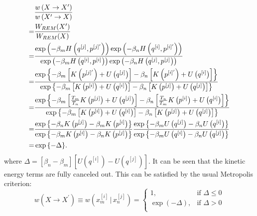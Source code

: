 \begin{align}
	&\frac{w\left(X\rightarrow X^\prime\right)}{w\left(X^\prime\rightarrow X\right)}\notag\\
	=&\frac{W_{REM}(X^\prime)}{W_{REM}(X)}\notag\\
	   =&\frac{\exp{\left(-\beta_m H\left(q^{[j]},p^{[j]^\prime}\right)\right)}\exp{\left(-\beta_n H\left(q^{[i]},p^{[i]^\prime}\right)\right)}}{\exp{\left(-\beta_m H\left(q^{[i]},p^{[i]^{ }}\right)\right)}\exp{\left(-\beta_n H\left(q^{[j]},p^{[j]^{ }}\right)\right)}}\notag\\
	   =&\frac{\exp{\left\{-\beta_m\left[K\left(p^{[j]^\prime}\right)+U\left(q^{[j]}\right)\right]-\beta_n\left[K\left(p^{[i]^\prime}\right)+U\left(q^{[i]}\right)\right]\notag\right\}}}
	   {\exp{\left\{-\beta_m\left[K\left(p^{[i]}\right)+U\left(q^{[i]}\right)\right]-\beta_n\left[K\left(p^{[j]}\right)+U\left(q^{[j]}\right)\right]\notag\right\}}}\notag\\
	   =&\frac{\exp{\left\{-\beta_m\left[\frac{T_m}{T_n}K\left(p^{[j]}\right)+U\left(q^{[j]}\right)\right]-\beta_n\left[\frac{T_n}{T_m}K\left(p^{[i]}\right)+U\left(q^{[i]}\right)\right]\notag\right\}}}
	   {\exp{\left\{-\beta_m\left[K\left(p^{[i]}\right)+U\left(q^{[i]}\right)\right]-\beta_n\left[K\left(p^{[j]}\right)+U\left(q^{[j]}\right)\right]\notag\right\}}}\notag\\
	   =&\dfrac{\exp{\left\{-\beta_n K\left(p^{[j]}\right)-\beta_m K\left(p^{[i]}\right)\right\}}}{\exp{\left\{-\beta_m K\left(p^{[i]}\right)-\beta_n K\left(p^{[j]}\right)\right\}}} \dfrac{\exp{\left\{-\beta_m U\left(q^{[j]}\right)-\beta_n U\left(q^{[i]}\right)\right\}}}{\exp{\left\{-\beta_m U\left(q^{[i]}\right)-\beta_n U\left(q^{[j]}\right)\right\}}}\notag\\
	   =&\exp{\left\{-\Delta\right\}}.
\end{align}
where $\Delta = \left[\beta_n-\beta_m\right]\left[U\left(q^{[i]}\right)-U\left(q^{[j]}\right)\right]$. It can be seen that the kinetic energy terms are fully canceled out.
This can be satisfied by the usual Metropolis criterion:
\begin{equation}
	w\left(X\rightarrow X^\prime\right)\equiv w\left(x_m^{[i]}\, \bigg\rvert\, x_n^{[j]}\right)= 
	\left\{ 
	\begin{array}{ll} 
		1, & \text{if } \Delta \leq 0\\ 
		\exp{(-\Delta)}, & \text{if } \Delta >0\\  
	\end{array} 
	\right. 
\end{equation}

